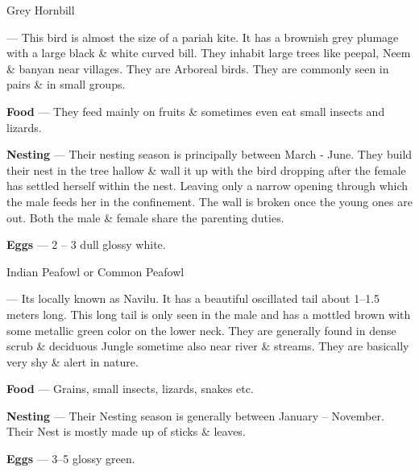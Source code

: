 \begin{bird}{Grey Hornbill}

 --- This bird is almost the size of a pariah kite. It has a brownish grey plumage with a large black \& white curved bill. They inhabit large trees like peepal, Neem \& banyan near villages. They are Arboreal birds. They are commonly seen in pairs \& in small groups.

{\large\bf Food} --- They feed mainly on fruits \& sometimes even eat small insects and lizards.

{\large\bf Nesting} --- Their nesting season is principally between March - June. They build their nest in the tree hallow \& wall it up with the bird dropping after the female has settled herself within the nest. Leaving only a narrow opening through which the male feeds her in the confinement. The wall is broken once the young ones are out. Both the male \& female share the parenting duties.

{\large\bf Eggs} --- 2 -- 3 dull glossy white.
\end{bird}

\begin{bird}{Indian Peafowl or Common Peafowl}

 --- Its locally known as Navilu. It has a beautiful oscillated tail about 1--1.5 meters long. This long tail is only seen in the male and has a mottled brown with some metallic green color on the lower neck. They are generally found in dense scrub \& deciduous Jungle sometime also near river \& streams. They are basically very shy \& alert in nature.

{\large\bf Food} --- Grains, small insects, lizards, snakes etc.

{\large\bf Nesting} --- Their Nesting season is generally between January -- November. Their Nest is mostly made up of sticks \& leaves.

{\large\bf Eggs} --- 3--5 glossy green.
\end{bird}

